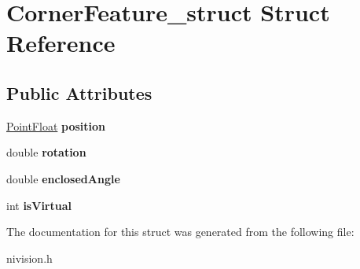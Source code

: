 \hypertarget{structCornerFeature__struct}{\section{\-Corner\-Feature\-\_\-struct \-Struct \-Reference}
\label{structCornerFeature__struct}
}
\subsection*{\-Public \-Attributes}
\begin{DoxyCompactItemize}
\item 
\hypertarget{structCornerFeature__struct_a9cae905c455ca29597ee2fd7d2e0e6f3}{\hyperlink{structPointFloat__struct}{\-Point\-Float} {\bfseries position}}\label{structCornerFeature__struct_a9cae905c455ca29597ee2fd7d2e0e6f3}

\item 
\hypertarget{structCornerFeature__struct_a7f9e5c0dd4e33925834f4cbd5c366bd4}{double {\bfseries rotation}}\label{structCornerFeature__struct_a7f9e5c0dd4e33925834f4cbd5c366bd4}

\item 
\hypertarget{structCornerFeature__struct_a175f1661c23ee1a019d8077a82a39012}{double {\bfseries enclosed\-Angle}}\label{structCornerFeature__struct_a175f1661c23ee1a019d8077a82a39012}

\item 
\hypertarget{structCornerFeature__struct_ae9cfdde960b71697e4710e8b451b78e9}{int {\bfseries is\-Virtual}}\label{structCornerFeature__struct_ae9cfdde960b71697e4710e8b451b78e9}

\end{DoxyCompactItemize}


\-The documentation for this struct was generated from the following file\-:\begin{DoxyCompactItemize}
\item 
nivision.\-h\end{DoxyCompactItemize}
